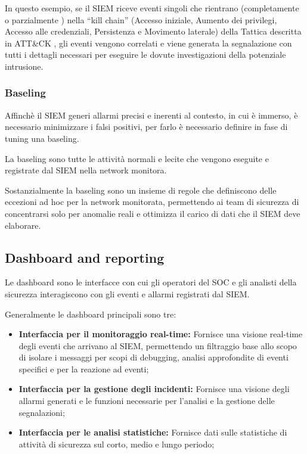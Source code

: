 In questo esempio, se il SIEM riceve eventi singoli che rientrano (completamente o parzialmente ) nella “kill chain” (Accesso iniziale, Aumento dei privilegi, Accesso alle credenziali, Persistenza e Movimento laterale) della Tattica descritta in ATT\&CK , gli eventi vengono correlati e viene generata la segnalazione con tutti i dettagli necessari per eseguire le dovute investigazioni della potenziale intrusione.


\subsubsection{Baseling}

Affinchè il SIEM generi allarmi precisi e inerenti al contesto, in cui è immerso, è necessario minimizzare i falsi positivi, per farlo è necessario definire in fase di tuning una baseling.\par

La baseling sono tutte le attività normali e lecite che vengono eseguite e registrate dal SIEM nella network monitora.\par

Sostanzialmente la baseling sono un insieme di regole che definiscono delle eccezioni ad hoc per la network monitorata, permettendo ai team di sicurezza di concentrarsi solo per anomalie reali e ottimizza il carico di dati che il SIEM deve elaborare.\par


\subsection{Dashboard and reporting}

Le dashboard sono le interfacce con cui gli operatori del SOC e gli analisti della sicurezza interagiscono con gli eventi e allarmi registrati dal SIEM.

Generalmente le dashboard principali sono tre:

\begin{itemize}
    \item\textbf{Interfaccia per il monitoraggio real-time:} Fornisce una visione real-time degli eventi che arrivano al SIEM, permettendo un filtraggio base allo scopo di isolare i messaggi per scopi di debugging, analisi approfondite di eventi specifici e per la reazione ad eventi;
    \item\textbf{Interfaccia per la gestione degli incidenti:} Fornisce una visione degli allarmi generati e le funzioni necessarie per l’analisi e la gestione delle segnalazioni;
    \item\textbf{Interfaccia per le analisi statistiche:} Fornisce dati sulle statistiche di attività di sicurezza sul corto, medio e lungo periodo;
\end{itemize}

